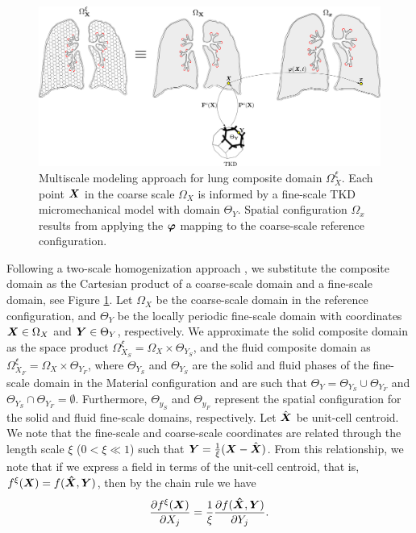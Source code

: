 \documentclass[preprint,3p,12pt,number,sort&compress]{elsarticle}
\def\vec   #1{\text{\boldmath $#1$}{}}
\begin{document}
\begin{figure}[h!]
     \begin{center}
     \includegraphics[width=1 \textwidth]{./Figures/domain1.pdf}
     \caption[]{Multiscale modeling approach for lung composite domain $\Omega_X^{\xi}$. Each point $\vec X$ in the coarse scale $\Omega_X$ is informed by a fine-scale TKD micromechanical model with domain $\Theta_Y$. Spatial configuration $\Omega_{x}$ results from applying the $\vec \varphi$ mapping to the coarse-scale reference configuration.
     }
     \label{fig:two-scale-domain}
     \end{center}
\end{figure}
Following a two-scale homogenization approach \cite{BakhvalovPanasenko1989}, we substitute the composite domain as the Cartesian product of a coarse-scale domain and a fine-scale domain, see Figure \ref{fig:two-scale-domain}. Let $\Omega_X$ be the coarse-scale domain in the reference configuration, and $\Theta_Y$ be the locally periodic fine-scale domain with coordinates $\vec X \in \Omega_X$ and $\vec Y \in \Theta_Y$, respectively. We approximate the solid composite domain as the space product $\Omega_{X_S}^{\xi} = \Omega_X \times \Theta_{Y_S}$, and the fluid composite domain as $\Omega_{X_F}^{\xi} = \Omega_X \times \Theta_{Y_F}$, where $\Theta_{Y_S}$ and $\Theta_{Y_S}$ are the solid and fluid phases of the fine-scale domain in the Material configuration and are such that $\Theta_Y = \Theta_{Y_S} \cup \Theta_{Y_F}$ and $\Theta_{Y_S} \cap \Theta_{Y_F} = \emptyset$. Furthermore, $\Theta_{y_S}$ and $\Theta_{y_F}$ represent the spatial configuration for the solid and fluid fine-scale domains, respectively. Let $\hat{\vec X}$ be unit-cell centroid. We note that the fine-scale and coarse-scale coordinates are related through the length scale $\xi$ ($0 < \xi \ll 1$) such that $\vec Y = \frac{1}{\xi} ( \vec X - \hat{\vec X})$. From this relationship, we note that if we express a field in terms of the unit-cell centroid, that is, $f^{\xi}(\vec X)=f (\vec{\hat{X}}, \vec Y)$, then by the chain rule we have \cite{fish2013practical,fish2008mathematical}
\begin{equation}
    \frac{\partial f^{\xi} (\vec X)}{\partial X_j }=\frac{1}{\xi} \frac{\partial f (\vec{\hat{X}}, \vec Y)}{\partial  Y_j}.
    \label{eq:chain-rule}
\end{equation}
\end{document}
